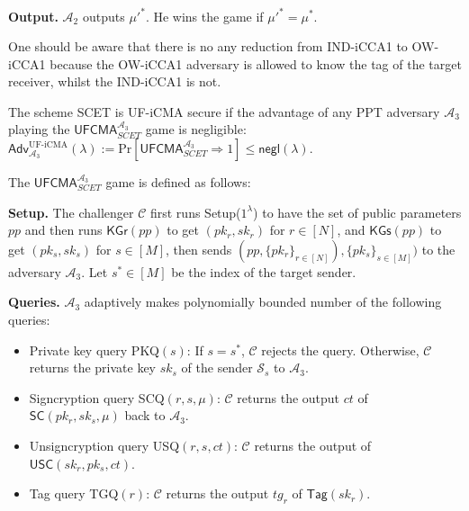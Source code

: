 \documentclass[a4paper,11pt,onecolumn]{elsarticle}
\def\Pr{\mathrm{Pr}}
\begin{document}
			\textbf{Output.} $\mathcal{A}_2$  outputs $\mu'^*$. He wins the game if $\mu'^*=\mu^*$.
		
			
			
			
				\begin{remark} One should be aware that there is no any reduction from IND-iCCA1 to OW-iCCA1 because the OW-iCCA1 adversary is allowed to know the tag of the target receiver, whilst the IND-iCCA1 is not. 
				\end{remark}	
			
			\begin{definition}[UF-iCMA] \label{ufcma}
				The scheme SCET is UF-iCMA secure if the advantage of any PPT adversary  $\mathcal{A}_3$ playing the $\mathsf{UFCMA}^{\mathcal{A}_3}_{SCET}$ game is negligible: $\mathsf{Adv}^{\text{UF-iCMA}}_{\mathcal{A}_3}(\lambda):= \Pr[\mathsf{UFCMA}^{\mathcal{A}_3}_{SCET}\Rightarrow 1]\leq \mathsf{negl}(\lambda).$
			\end{definition}
			
		The $\mathsf{UFCMA}^{\mathcal{A}_3}_{SCET}$ game is defined as follows:
			
			
	\textbf{Setup.} The challenger  $\mathcal{C}$ first runs \textsf{Setup($1^{\lambda}$)} to have the set of  public parameters $pp$ and then runs $\textsf{KGr}(pp)$ to get $(pk_{r}, sk_{r})$ for $r\in[N]$, and $\textsf{KGs}(pp)$ to get $(pk_{s}, sk_{s})$ for $s\in[M]$, then sends $(pp, \{pk_{r}\}_{r \in [N]}), \{pk_{s}\}_{s \in [M]})$ to the adversary $\mathcal{A}_3$. Let $s^*\in[M]$ be the index of the target sender.
	
	 \textbf{Queries.}  $\mathcal{A}_3$ adaptively makes polynomially bounded number of the following queries:
				\begin{itemize}
					\item Private key query PKQ$(s)$:
					If $s=s^*$, $\mathcal{C}$ rejects the query. Otherwise, $\mathcal{C}$ returns the private key $sk_{s}$ of the sender $\mathcal{S}_{s}$  to $\mathcal{A}_3$. 
				
					\item Signcryption query SCQ$(r,s,\mu)$: $\mathcal{C}$ returns the output $ct$ of $\textsf{SC}(pk_{r},sk_{s},\mu)$ back to $\mathcal{A}_3$.
					\item Unsigncryption query USQ$(r,s,ct)$:  $\mathcal{C}$ returns the output of $\textsf{USC}(sk_{r},pk_{s},ct)$.
					\item Tag query TGQ$(r)$: $\mathcal{C}$ returns the output $tg_{r}$ of $\textsf{Tag}(sk_{r})$.
				\end{itemize}
				
\end{document}
